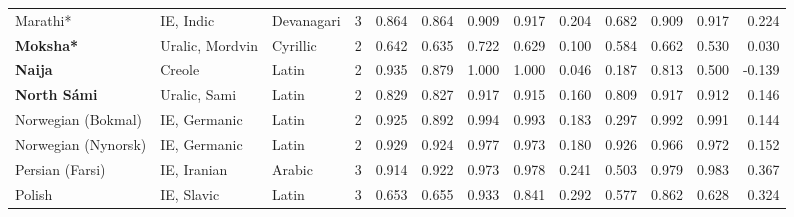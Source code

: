 \begin{tabular}{lllrrrrrrrrrr}
               Marathi* &                       IE, Indic & Devanagari &         3 &                       0.864 &                         0.864 &         0.909 &                  0.917 &            0.204 &                         0.682 &         0.909 &                  0.917 &            0.224 \\
       \textbf{Moksha*} &                 Uralic, Mordvin &   Cyrillic &         2 &                       0.642 &                         0.635 &         0.722 &                  0.629 &            0.100 &                         0.584 &         0.662 &                  0.530 &            0.030 \\
         \textbf{Naija} &                          Creole &      Latin &         2 &                       0.935 &                         0.879 &         1.000 &                  1.000 &            0.046 &                         0.187 &         0.813 &                  0.500 &           -0.139 \\
    \textbf{North Sámi} &                    Uralic, Sami &      Latin &         2 &                       0.829 &                         0.827 &         0.917 &                  0.915 &            0.160 &                         0.809 &         0.917 &                  0.912 &            0.146 \\
     Norwegian (Bokmal) &                    IE, Germanic &      Latin &         2 &                       0.925 &                         0.892 &         0.994 &                  0.993 &            0.183 &                         0.297 &         0.992 &                  0.991 &            0.144 \\
    Norwegian (Nynorsk) &                    IE, Germanic &      Latin &         2 &                       0.929 &                         0.924 &         0.977 &                  0.973 &            0.180 &                         0.926 &         0.966 &                  0.972 &            0.152 \\
        Persian (Farsi) &                     IE, Iranian &     Arabic &         3 &                       0.914 &                         0.922 &         0.973 &                  0.978 &            0.241 &                         0.503 &         0.979 &                  0.983 &            0.367 \\
                 Polish &                      IE, Slavic &      Latin &         3 &                       0.653 &                         0.655 &         0.933 &                  0.841 &            0.292 &                         0.577 &         0.862 &                  0.628 &            0.324 \\

\end{tabular}
